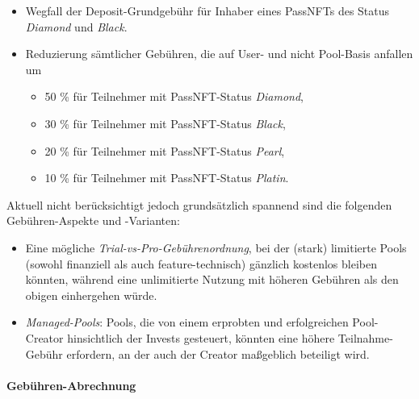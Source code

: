 \begin{Assumption}[Gebühren]
\begin{itemize}
	\item Wegfall der Deposit-Grundgebühr für Inhaber eines PassNFTs des Status \textit{Diamond} und \textit{Black}.
	\item Reduzierung sämtlicher Gebühren, die auf User- und nicht Pool-Basis anfallen um
	\begin{itemize}
		\item 50 \% für Teilnehmer mit PassNFT-Status \textit{Diamond},
		\item 30 \% für Teilnehmer mit PassNFT-Status \textit{Black},
		\item 20 \% für Teilnehmer mit PassNFT-Status \textit{Pearl},
		\item 10 \% für Teilnehmer mit PassNFT-Status \textit{Platin}.
	\end{itemize}
\end{itemize}

\vspace{0.5cm}	

Aktuell nicht berücksichtigt jedoch grundsätzlich spannend sind die folgenden Gebühren-Aspekte und -Varianten:

\begin{itemize}
	\item Eine mögliche \textit{Trial-vs-Pro-Gebührenordnung}, bei der (stark) limitierte Pools (sowohl finanziell als auch feature-technisch) gänzlich kostenlos bleiben könnten, während eine unlimitierte Nutzung mit höheren Gebühren als den obigen einhergehen würde.
	\item \textit{Managed-Pools}: Pools, die von einem erprobten und erfolgreichen Pool-Creator hinsichtlich der Invests gesteuert, könnten eine höhere Teilnahme-Gebühr erfordern, an der auch der Creator maßgeblich beteiligt wird. 
\end{itemize}	

\end{Assumption}

\vspace{0.5cm}



\paragraph{Gebühren-Abrechnung}
\textbf{ }
\vspace{0.2cm}





